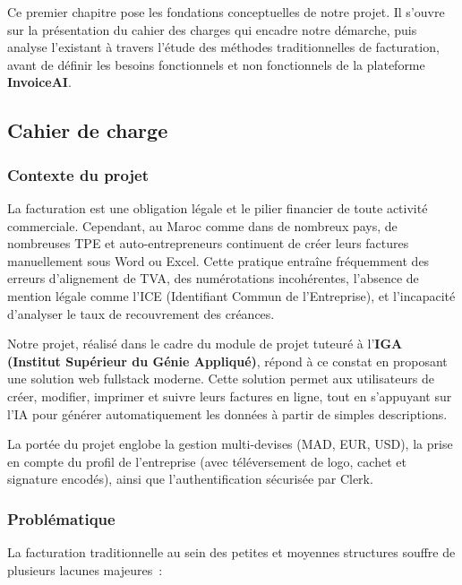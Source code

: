 \documentclass[a4paper,12pt]{extarticle}
\begin{document}
Ce premier chapitre pose les fondations conceptuelles de notre projet. Il s'ouvre sur la présentation du cahier des charges qui encadre notre démarche, puis analyse l'existant à travers l'étude des méthodes traditionnelles de facturation, avant de définir les besoins fonctionnels et non fonctionnels de la plateforme \textbf{InvoiceAI}.

\subsection{Cahier de charge}

\subsubsection{Contexte du projet}

La facturation est une obligation légale et le pilier financier de toute activité commerciale. Cependant, au Maroc comme dans de nombreux pays, de nombreuses TPE et auto-entrepreneurs continuent de créer leurs factures manuellement sous Word ou Excel. Cette pratique entraîne fréquemment des erreurs d'alignement de TVA, des numérotations incohérentes, l'absence de mention légale comme l'ICE (Identifiant Commun de l'Entreprise), et l'incapacité d'analyser le taux de recouvrement des créances.

Notre projet, réalisé dans le cadre du module de projet tuteuré à l'\textbf{IGA (Institut Supérieur du Génie Appliqué)}, répond à ce constat en proposant une solution web fullstack moderne. Cette solution permet aux utilisateurs de créer, modifier, imprimer et suivre leurs factures en ligne, tout en s'appuyant sur l'IA pour générer automatiquement les données à partir de simples descriptions.

La portée du projet englobe la gestion multi-devises (MAD, EUR, USD), la prise en compte du profil de l'entreprise (avec téléversement de logo, cachet et signature encodés), ainsi que l'authentification sécurisée par Clerk.

\subsubsection{Problématique}

La facturation traditionnelle au sein des petites et moyennes structures souffre de plusieurs lacunes majeures~:
\end{document}
